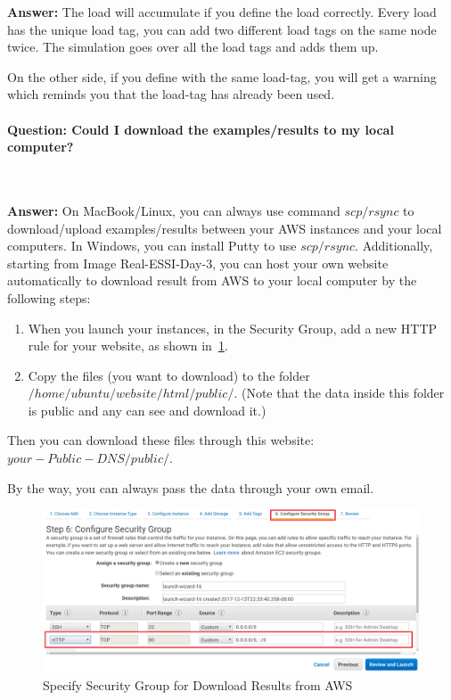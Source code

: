\textbf{Answer:} 
The load will accumulate if you define the load correctly.
Every load has the unique load tag, you can add two different load tags on the same node twice. The simulation goes over all the load tags and adds them up. 

On the other side, if you define with the same load-tag, you will get a warning which reminds you that the load-tag has already been used.



\paragraph{Question: Could I download the examples/results to my local computer?} ~

\textbf{Answer:} 
On MacBook/Linux, you can always use command $scp/rsync$ to download/upload examples/results between your AWS instances and your local computers.
In Windows, you can install Putty to use $scp/rsync$.
Additionally, starting from Image Real-ESSI-Day-3, you can host your own website automatically to download result from AWS to your local computer by the following steps:
\begin{enumerate}
	\item When you launch your instances, in the Security Group, add a new HTTP rule for your website, as shown in~\ref{fig_Security_group_AWS}.
	\item Copy the files (you want to download) to the folder $/home/ubuntu/website/html/public/$.
(Note that the data inside this folder is public and any can see and download it.)
\end{enumerate}

Then you can download these files through this website:
$your-Public-DNS/public/$.

By the way, you can always pass the data through your own email.

\begin{figure}[H]
  \centering
  \includegraphics[width = 15cm]{./Figure-files/QA/security_group.png}
  \caption{Specify Security Group for Download Results from AWS}
  \label{fig_Security_group_AWS}
\end{figure}




